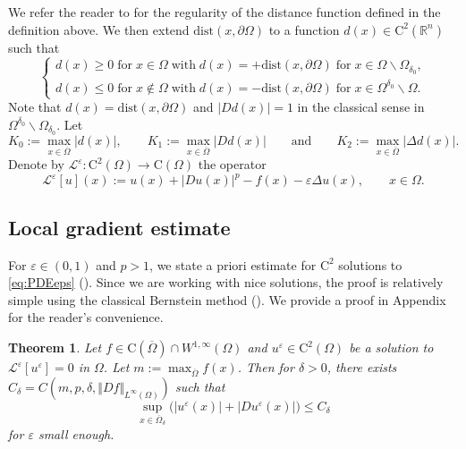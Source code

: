 \documentclass[12pt,reqno]{amsart}
\numberwithin{figure}{section}
\theoremstyle{plain}
\newtheorem{thm}{Theorem}[section]
\theoremstyle{remark}
\numberwithin{equation}{section}
\newcommand{\rmC}{\mathrm{C}}
\begin{document}
We refer the reader to \cite{gilbarg_elliptic_2001} for the regularity of the distance function defined in the definition above. We then extend $\mathrm{dist}(x,\partial\Omega)$ to a function $d(x)\in \mathrm{C}^2(\mathbb{R}^n)$ such that 
\begin{equation}\label{e:distance_def}
    \begin{cases}
    d(x)\geq 0\;\text{for}\;x\in\Omega\;\text{with}\;d(x) = +\mathrm{dist}(x,\partial\Omega)\;\text{for}\;x\in \Omega\backslash \Omega_{\delta_0},\\
    d(x)\leq 0\;\text{for}\;x\notin \Omega\;\text{with}\;d(x) = -\mathrm{dist}(x,\partial\Omega)\;\text{for}\;x\in \Omega^{\delta_0}\backslash \Omega.
    \end{cases}
\end{equation}
Note that $d(x) = \mathrm{dist}(x,\partial\Omega)$ and $|D d(x)| = 1$ in the classical sense in $\Omega^{\delta_0}\backslash \Omega_{\delta_0}$. Let 
\begin{equation}\label{boundond}
   K_0:= \max_{x\in \overline{\Omega}}|d(x)|, \qquad K_1 := \max_{x\in \overline{\Omega}} |D d(x)| \qquad\text{and}\qquad K_2 := \max_{x\in \overline{\Omega}} |\Delta d(x)|.
\end{equation}
\noindent Denote by $\mathcal{L}^\varepsilon:\rmC^2(\Omega)\to \rmC(\Omega)$ the operator
\begin{equation*}
    \mathcal{L}^\varepsilon[u](x) :=   u(x) + |Du(x)|^p - f(x) - \varepsilon \Delta u(x), \qquad x\in \Omega.
\end{equation*}



\subsection{Local gradient estimate} For $\varepsilon \in (0,1)$ and $p>1$, we state a priori estimate for $\rmC^2$ solutions to \eqref{eq:PDEeps} (\cite[Appendix]{Lasry1989}). Since we are working with nice solutions, the proof is relatively simple using the classical Bernstein method (\cite{bernstein_sur_1910}). We provide a proof in Appendix for the reader's convenience. 


\begin{thm}\label{thm:grad_1} Let $f\in \rmC(\overline{\Omega})\cap W^{1,\infty}(\Omega)$ and $u^\varepsilon \in \mathrm{C}^2(\Omega)$ be a solution to $\mathcal{L}^\varepsilon[u^\varepsilon] = 0$ in $\Omega$. Let $m:= \max_{\overline{\Omega}}f(x)$. Then for $\delta>0$, there exists $C_\delta = C(m,p,\delta, \Vert D f\Vert_{L^\infty(\Omega)})$ such that 
\begin{equation*}
    \sup_{x\in \overline{\Omega}_\delta} \Big(|u^\varepsilon(x)|+|Du^\varepsilon(x)|\Big) \leq C_\delta
\end{equation*}
for $\varepsilon$ small enough.
\end{thm}
\end{document}
